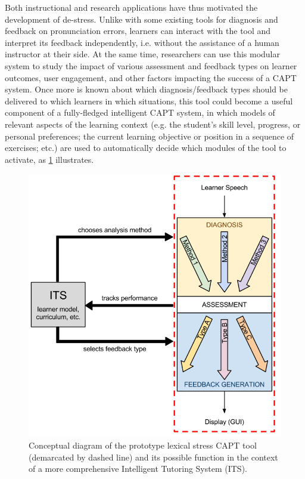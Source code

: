 \documentclass[a4paper]{article}
\newcommand{\TODO}[1]{{\color{red}\textbf{[TODO #1]}}}
\begin{document}
Both instructional and research applications have thus motivated the development of de-stress.
Unlike with some existing tools for diagnosis and feedback on pronunciation errors, learners can interact with the tool and interpret its feedback independently, i.e. without the assistance of a human instructor at their side.
At the same time, researchers can use this modular system to study the impact of various assessment and feedback types on learner outcomes, user engagement, and other factors impacting the success of a CAPT system. 
%
Once more is known about which diagnosis/feedback types should be delivered to which learners in which situations, this tool could become a useful component of a fully-fledged intelligent CAPT system, in which 
models of relevant aspects of the learning context (e.g. the student's skill level, progress, or personal preferences; the current learning objective or position in a sequence of exercises; etc.)
are used to automatically decide which modules of the tool to activate, as \cref{fig:hourglass-ITS} illustrates.

	\begin{figure}[tb] 
		\centering
		\includegraphics[height=.25\textheight]{../../img/hourglass-ITS} 
		\caption[Conceptual diagram of the prototype lexical stress CAPT tool]{Conceptual diagram of the prototype lexical stress CAPT tool (demarcated by dashed line) and its possible function in the context of a more comprehensive Intelligent Tutoring System (ITS).}
		\label{fig:hourglass-ITS}
	\end{figure}
	
\end{document}

